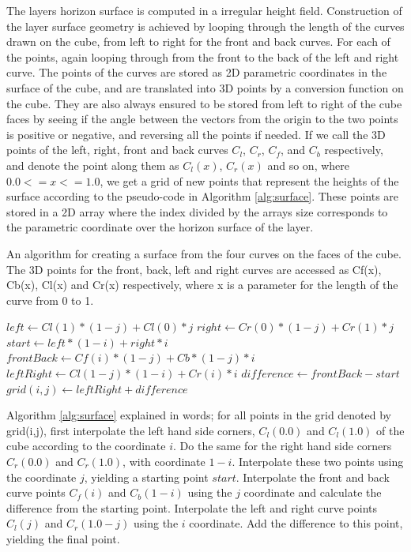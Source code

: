 \documentclass[a4paper,12pt]{report}
\begin{document}
The layers horizon surface is computed in a irregular height field. Construction of the layer surface geometry is achieved by looping through the length of the curves drawn on the cube, from left to right for the front and back curves. For each of the points, again looping through from the front to the back of the left and right curve. The points of the curves are stored as 2D parametric coordinates in the surface of the cube, and are translated into 3D points by a conversion function on the cube. They are also always ensured to be stored from left to right of the cube faces by seeing if the angle between the vectors from the origin to the two points is positive or negative, and reversing all the points if needed. If we call the 3D points of the left, right, front and back curves $C_l$, $C_r$, $C_f$, and $C_b$ respectively, and denote the point along them as $C_l(x)$, $C_r(x)$ and so on, where $0.0 <= x <= 1.0$, we get a grid of new points that represent the heights of the surface according to the 
pseudo-code in Algorithm \ref{alg:surface}. These points are stored in a 2D array where the index divided by the arrays size corresponds to the parametric coordinate over the horizon surface of the layer.

\begin{algorithm}
\caption{An algorithm for creating a surface from the four curves on the faces of the cube. The 3D points for the front,
back, left and right curves are accessed as Cf(x), Cb(x), Cl(x) and Cr(x) respectively, where x is a parameter for the length of the curve from 0 to 1.}
\label{alg:surface}
\begin{algorithmic}
  \State $left \gets Cl(1)*(1-j) + Cl(0)*j$
  \State $right \gets Cr(0)*(1-j) + Cr(1)*j$
  \State $start \gets left*(1-i) + right*i$
  \State $frontBack \gets Cf(i)*(1-j) + Cb*(1-j)*i$
  \State $leftRight \gets Cl(1-j)*(1-i) + Cr(i)*i$
  \State $difference \gets frontBack - start$
  \State $grid(i,j) \gets leftRight + difference$
\EndFor
\end{algorithmic}
\end{algorithm}

Algorithm \ref{alg:surface} explained in words; for all points in the grid denoted by grid(i,j), first interpolate the left hand side corners, $C_l(0.0)$ and $C_l(1.0)$ of the cube according to the coordinate $i$. Do the same for the right hand side corners $C_r(0.0)$ and $C_r(1.0)$, with coordinate $1-i$. Interpolate these two points using the coordinate $j$, yielding a starting point $start$. Interpolate the front and back curve points $C_f(i)$ and $C_b(1-i)$ using the $j$ coordinate and calculate the difference from the starting point. Interpolate the left and right curve points $C_l(j)$ and $C_r(1.0-j)$ using the $i$ coordinate. Add the difference to this point, yielding the final point. 
\end{document}
